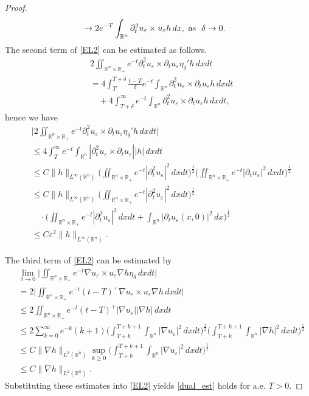 \documentclass[12pt,twoside,reqno]{amsart}
\theoremstyle{definition}              %
\theoremstyle{remark}                  %
\newcommand{\R}{\mathbb{R}}                 %
\newcommand{\eps}{\varepsilon}
\renewcommand{\1}{\mathbbm{1}}                                      %
\numberwithin{equation}{section}
\numberwithin{definition}{section}
\numberwithin{theorem}{section}
\numberwithin{remark}{section}
\begin{document}
\begin{proof}
\begin{align*}
&\rightarrow 2e^{-T}
\int_{\mathbb{R}^n} \partial_t^2u_\eps\times u_\eps h\,dx,
\ {\rm{as}}\ \ \delta\to 0.
\end{align*}
The second term of \eqref{EL2} can be estimated as follows.
\begin{align*}
&2\iint_{\mathbb{R}^n\times\R_+}e^{-t}
\partial_t^2u_\eps\times \partial_tu_\eps\eta_\delta' h\,dxdt\\
&
=4\int_{T}^{T+\delta} \frac{t-T}{\delta}
e^{-t}\int_{\mathbb{R}^n} \partial_t^2u_\eps\times 
\partial_tu_\eps h\,dxdt\\
&\quad+4\int_{T+\delta}^\infty  
e^{-t}\int_{\mathbb{R}^n} \partial_t^2u_\eps\times 
\partial_tu_\eps h\,dxdt,
\end{align*}  
hence we have
\begin{align*}
&\Big|2\iint_{\mathbb{R}^n\times\R_+}e^{-t}\partial_t^2u_\eps\times \partial_tu_\eps\eta_\delta' h\,dxdt\Big|\\
&\le 4\int_{T}^{\infty} e^{-t}\int_{\mathbb{R}^n} 
|\partial_t^2u_\eps\times \partial_tu_\eps| |h|\,dxdt\\
&\le C\|h\|_{L^\infty(\mathbb{R}^n)}
\Big(\iint_{\mathbb{R}^n\times\R_+}
e^{-t}|\partial_t^2u_\eps|^2\,dxdt\Big)^\frac12 
\Big(\iint_{\mathbb{R}^n\times\R_+}
e^{-t}|\partial_tu_\eps|^2\,dxdt\Big)^\frac12\\
&\le 
C\|h\|_{L^\infty(\mathbb{R}^n)}
\Big(\iint_{\mathbb{R}^n\times\R_+}
e^{-t}|\partial_t^2u_\eps|^2\,dxdt\Big)^\frac12\\
&\quad\cdot\Big(\iint_{\mathbb{R}^n\times\R_+}
e^{-t}|\partial_t^2u_\eps|^2\,dxdt+\int_{\mathbb{R}^n}|\partial_tu_\eps(x,0)|^2\,dx\Big)^\frac12\\
&\le C\eps^2 \|h\|_{L^\infty(\mathbb{R}^n)}.
\end{align*}  

The third term of \eqref{EL2} can be
estimated by 
\begin{align*}
&\lim_{\delta\to 0} 
\Big|\iint_{\mathbb{R}^n\times \R_+}e^{-t}\nabla u_\eps\times u_\eps \nabla h \eta_\delta\,dxdt\Big|\\
&=2\Big|\iint_{\mathbb{R}^n\times\R_+}e^{-t}(t-T)^+\nabla u_\eps\times u_\eps \nabla h\,dxdt\Big|\\
&\le 2\iint_{\mathbb{R}^n\times\R_+}e^{-t}(t-T)^+|\nabla u_\eps||\nabla h|\,dxdt\\
&\le 2\sum_{k=0}^\infty
e^{-k}(k+1)\Big(\int_{T+k}^{T+k+1}\int_{\mathbb{R}^n}|\nabla u_\eps|^2\,dxdt\Big)^\frac12 
\Big(\int_{T+k}^{T+k+1}\int_{\mathbb{R}^n}|\nabla h|^2\,dxdt\Big)^\frac12\\
&\le C\|\nabla h\|_{L^2(\mathbb{R}^n)}
\sup_{k\ge 0} \Big(\int_{T+k}^{T+k+1}\int_{\mathbb{R}^n}|\nabla u_\eps|^2\,dxdt\Big)^\frac12\\
&\le C\|\nabla h\|_{L^2(\mathbb{R}^n)}.
\end{align*}
Substituting these estimates into \eqref{EL2} yields \eqref{dual_est}
holds for a.e. $T>0$.
\end{proof}
\end{document}
